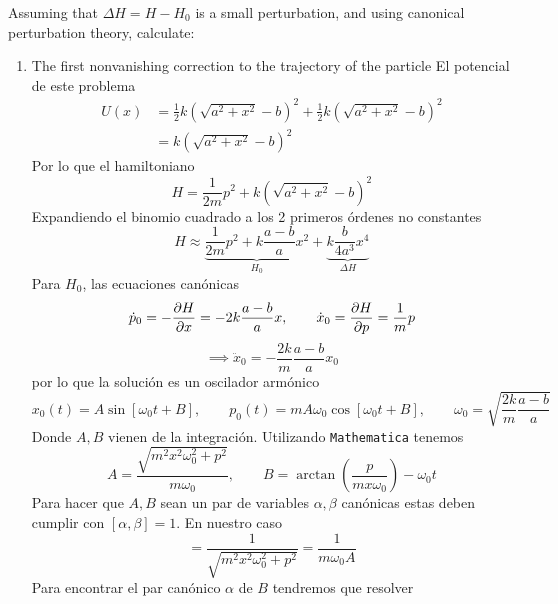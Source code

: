 \documentclass[]{article}
\numberwithin{equation}{section}
\begin{document}
Assuming that $\Delta H = H - H_0$ is a small perturbation, and using canonical perturbation theory, calculate:
\begin{enumerate}
	\item[a.] The first nonvanishing correction to the trajectory of the particle
	\resp El potencial de este problema
	\begin{align}
		U(x) &= \frac{1}{2} k \left(\sqrt{a^2 + x^2} - b\right)^2 + \frac{1}{2} k \left(\sqrt{a^2 + x^2} - b\right)^2\nonumber\\
		&= k \left(\sqrt{a^2 + x^2} - b\right)^2
	\end{align}
	Por lo que el hamiltoniano
	\begin{equation}
		H = \frac{1}{2 m} p^2 + k \left(\sqrt{a^2 + x^2} - b\right)^2
	\end{equation}
	Expandiendo el binomio cuadrado a los 2 primeros órdenes no constantes
	\begin{equation}
		H \approx \underbrace{\frac{1}{2 m} p^2 + k \frac{a - b}{a} x^2}_{H_0} + \underbrace{k \frac{b}{4 a^3} x^4}_{\Delta H}
	\end{equation}
	Para $H_0$, las ecuaciones canónicas
	\begin{equation*}
		\dot{p}_0 = -\dfrac{\partial H}{\partial x} = - 2 k \frac{a - b}{a} x, \qquad \dot{x}_0 = \dfrac{\partial H}{\partial p} = \frac{1}{m} p
	\end{equation*}
	\begin{equation*}
		\implies \ddot{x}_0 = -\frac{2 k}{m} \frac{a - b}{a} x_0
	\end{equation*}
	por lo que la solución es un oscilador armónico 
	\begin{equation}
		x_0(t) = A \sin\left[\omega_0 t + B\right], \qquad p_0(t) = m A \omega_0 \cos\left[\omega_0 t + B\right] , \qquad \omega_0 = \sqrt{\frac{2 k}{m} \frac{a - b}{a}}
	\end{equation}
	Donde $A, B$ vienen de la integración. Utilizando \texttt{Mathematica} tenemos
	\begin{equation}
		A = \frac{\sqrt{m^2 x^2 \omega_0 ^2+p^2}}{m \omega_0 }, \qquad B = \arctan \left(\frac{p}{m x \omega_0 }\right) - \omega_0 t
	\end{equation}
	Para hacer que $A,B$ sean un par de variables $\alpha, \beta$ canónicas estas deben cumplir con $[\alpha,\beta] = 1$. En nuestro caso
	\begin{equation}
		[A,B] = \frac{1}{\sqrt{m^2 x^2 \omega_0 ^2+p^2}} = \frac{1}{m \omega_0 A}
	\end{equation}
	Para encontrar el par canónico $\alpha$ de $B$ tendremos que resolver

\end{enumerate}
\end{document}
